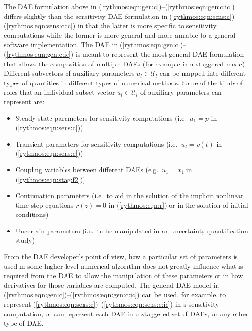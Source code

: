 \documentclass[pdf,ps2pdf,11pt]{SANDreport}
\begin{document}
The DAE formulation above in
(\ref{rythmos:eqn:gen:c})--(\ref{rythmos:eqn:gen:c:ic}) differs slightly than
the sensitivity DAE formulation in
(\ref{rythmos:eqn:sens:c})--(\ref{rythmos:eqn:sens:c:ic}) in that the latter
is more specific to sensitivity computations while the former is more general
and more amiable to a general software implementation.  The DAE in
(\ref{rythmos:eqn:gen:c})--(\ref{rythmos:eqn:gen:c:ic}) is meant to represent
the most general DAE formulation that allows the composition of multiple DAEs
(for example in a staggered mode).  Different subvectors of auxiliary
parameters $u_l\in\mathcal{U}_l$ can be mapped into different types of
quantities in different types of numerical methods.  Some of the kinds of
roles that an individual subset vector $u_l\in\mathcal{U}_l$ of auxiliary
parameters can represent are:
%
\begin{itemize}
%
{}\item Steady-state parameters for sensitivity computations (i.e.\ $u_1 =
p$ in (\ref{rythmos:eqn:sens:c}))
%
{}\item Transient parameters for sensitivity computations (i.e.\ $u_2 = v(t)$
in (\ref{rythmos:eqn:sens:c}))
%
{}\item Coupling variables between different DAEs (e.g.\ $u_1 = x_1$ in
(\ref{rythmos:eqn:stag:f2}))
%
{}\item Continuation parameters (i.e.\ to aid in the solution of the implicit
nonlinear time step equations $r(z)=0$ in (\ref{rythmos:eqn:r}) or in the
solution of initial conditions)
%
{}\item Uncertain parameters (i.e.\ to be manipulated in an uncertainty
quantification study)
%
\end{itemize}

From the DAE developer's point of view, how a particular set of parameters is
used in some higher-level numerical algorithm does not greatly influence what
is required from the DAE to allow the manipulation of these parameters or in
how derivatives for those variables are computed.  The general DAE model in
(\ref{rythmos:eqn:gen:c})--(\ref{rythmos:eqn:gen:c:ic}) can be used, for
example, to represent
(\ref{rythmos:eqn:sens:c})--(\ref{rythmos:eqn:sens:c:ic}) in a sensitivity
computation, or can represent each DAE in a staggered set of DAEs, or any
other type of DAE.
\end{document}
